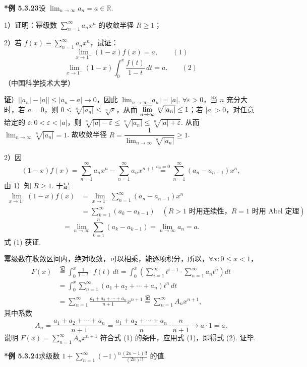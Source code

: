 \documentclass[UTF8,12pt,a4paper,fontset=fandol]{ctexart}
\begin{document}
\noindent\textbf{*例 5.3.23}\quad 设 $\displaystyle\lim_{n\to\infty}a_n=a\in\mathbb R$.

1）证明：幂级数 $\displaystyle\sum_{n=1}^{\infty}a_nx^n$ 的收敛半径 $R\ge1$；

2）若 $f(x)\equiv\displaystyle\sum_{n=1}^{\infty}a_nx^n$，试证：
\[
  \lim_{x\to1^-}(1-x)f(x)=a, \qquad(1)
\]
\[
  \lim_{x\to1^-}(1-x)\int_0^x\frac{f(t)}{1-t}\,dt=a. \qquad(2)
\]
（中国科学技术大学）

\noindent\textbf{证}）$\big||a_n|-|a|\big|\le|a_n-a|\to0$，因此
$\displaystyle\lim_{n\to\infty}|a_n|=|a|$. $\forall\varepsilon>0$，当 $n$ 充分大时，若 $a=0$，则
$0\le\sqrt[n]{|a_n|}\le\sqrt[n]{\varepsilon}$，从而
$\displaystyle\varlimsup_{n\to\infty}\sqrt[n]{|a_n|}\le1$；若 $|a|>0$，对任意给定的
$\varepsilon:0<\varepsilon<|a|$，则
$\sqrt[n]{|a|-\varepsilon}\le\sqrt[n]{|a_n|}\le\sqrt[n]{|a|+\varepsilon}$. 从而
$\displaystyle\lim_{n\to\infty}\sqrt[n]{|a_n|}=1$. 故收敛半径
$R=\dfrac1{\displaystyle\lim_{n\to\infty}\sqrt[n]{|a_n|}}\ge1$.

2）因
\[
  (1-x)f(x)=\sum_{n=1}^{\infty}a_nx^n-\sum_{n=1}^{\infty}a_nx^{n+1}
  \overset{a_0=0}{=}\sum_{n=1}^{\infty}(a_n-a_{n-1})x^n,
\]
由 1）知 $R\ge1$. 于是
\[
\begin{aligned}
\lim_{x\to1^-}(1-x)f(x)
&=\lim_{x\to1^-}\sum_{n=1}^{\infty}(a_n-a_{n-1})x^n\\
&=\sum_{k=1}^{\infty}(a_k-a_{k-1})\quad(R>1\text{ 时用连续性，}R=1\text{ 时用 Abel 定理})
\end{aligned}
\]
\[
  =\lim_{n\to\infty}\sum_{k=1}^n(a_k-a_{k-1})=\lim_{n\to\infty}a_n=a.
\]
式 (1) 获证.

幂级数在收敛区间内，绝对收敛，可以相乘，能逐项积分，所以，$\forall x:0\le x<1$，
\[
\begin{aligned}
F(x)&\overset{\text{记}}{=}\int_0^x\frac1{1-t}\cdot f(t)\,dt
=\int_0^x\left(\sum_{i=1}^{\infty}t^{i-1}\cdot\sum_{n=1}^{\infty}a_nt^n\right)dt\\
&=\int_0^x\sum_{n=1}^{\infty}(a_1+a_2+\cdots+a_n)t^n\,dt\\
&=\sum_{n=1}^{\infty}\frac{a_1+a_2+\cdots+a_n}{n+1}x^{n+1}
\overset{\text{记}}{=}\sum_{n=1}^{\infty}A_nx^{n+1},
\end{aligned}
\]
其中系数
\[
  A_n=\frac{a_1+a_2+\cdots+a_n}{n+1}
  =\frac{a_1+a_2+\cdots+a_n}{n}\cdot\frac{n}{n+1}
  \to a\cdot1=a.
\]
说明 $\displaystyle F(x)=\sum_{n=1}^{\infty}A_nx^{n+1}$ 符合式 (1) 的条件，应用式 (1)，即得式 (2). 证毕.

\noindent\textbf{*例 5.3.24}\quad 求级数
$\displaystyle 1+\sum_{n=1}^{\infty}(-1)^n\frac{(2n-1)!!}{(2n)!!}$ 的值.
\end{document}
